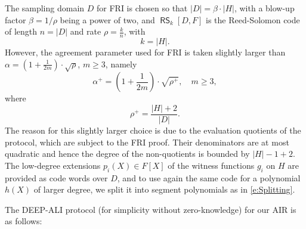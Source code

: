 \documentclass[11pt,article,oneside]{memoir}
\theoremstyle{definition}
\theoremstyle{remark}
\DeclareMathOperator{\RS}{\mathsf{RS}}
\begin{document}
The sampling domain $D$ for FRI is chosen so that $|D|=\beta\cdot |H|$, with a blow-up factor $\beta =1/\rho$ being a power of two, and $\RS_k[D,F]$ is the Reed-Solomon code of length $n= |D|$ and rate $\rho=\frac{k}{n}$, with
\begin{equation}
k = |H|.
\end{equation}
However, the agreement parameter used for FRI is taken slightly larger than $\alpha = \left(1+\frac{1}{2m}\right)\cdot\sqrt\rho$, $m\geq 3$, namely 
\begin{equation}
\alpha^+= \left(1+\frac{1}{2m}\right)\cdot \sqrt{\rho^+}, \quad m\geq 3, 
\end{equation}
where 
\begin{equation}
\rho^+=\frac{|H|+2}{|D|}.
\end{equation}
The reason for this slightly larger choice is due to the evaluation quotients of the protocol, which are subject to the FRI proof. 
Their denominators are at most quadratic and hence the degree of the non-quotients is bounded by $|H|-1 + 2$.
The low-degree extensions $p_i(X)\in F[X]$ of the witness functions $g_i$ on $H$ are provided as code words over $D$, and to use again the same code for a polynomial $h(X)$ of larger degree, we split it into segment polynomials as in \eqref{e:Splitting}. 


The DEEP-ALI protocol (for simplicity without zero-knowledge) for our AIR is as follows: 
\end{document}
